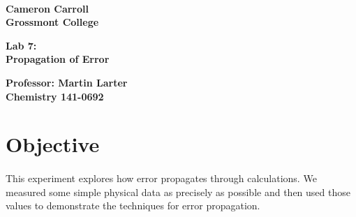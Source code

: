 \documentclass[fleqn,titlepage]{article}
\begin{document}
\begin{titlepage}
  \mbox{}\\[1.25cm]
  \textbf{\LARGE Cameron Carroll \\ Grossmont College}\\[2.25cm]
  \begin{center}
    \textbf{\huge Lab 7: \\ Propagation of Error}\\[2.50cm]
  \end{center}
  \textbf{\LARGE Professor: Martin Larter \\ Chemistry 141-0692} \\
  \vfill
\end{titlepage}

\section*{Objective}
  \paragraph{} This experiment explores how error propagates through calculations. We measured some simple physical data as precisely as possible and then used those values to demonstrate the techniques for error propagation.

\newpage
\end{document}
